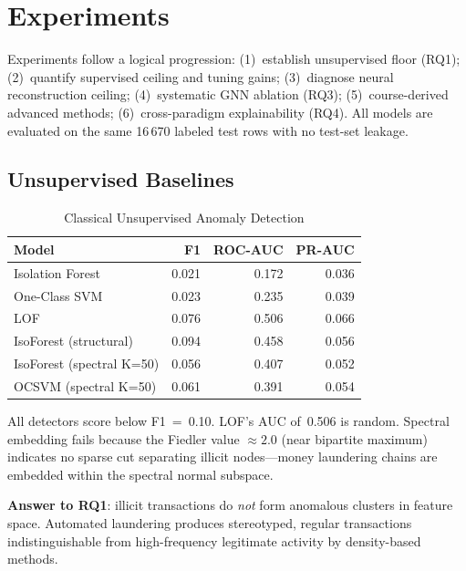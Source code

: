 \documentclass[conference]{IEEEtran}
\begin{document}
\section{Experiments}

Experiments follow a logical progression: (1)~establish unsupervised floor
(RQ1); (2)~quantify supervised ceiling and tuning gains; (3)~diagnose neural
reconstruction ceiling; (4)~systematic GNN ablation (RQ3); (5)~course-derived
advanced methods; (6)~cross-paradigm explainability (RQ4).  All models are
evaluated on the same 16\,670 labeled test rows with no test-set leakage.

\subsection{Unsupervised Baselines}

\begin{table}[htbp]
\centering
\caption{Classical Unsupervised Anomaly Detection}
\label{tab:unsupervised}
\renewcommand{\arraystretch}{1.1}
\begin{tabular}{@{}lrrr@{}}
\toprule
Model & F1 & ROC-AUC & PR-AUC \\
\midrule
Isolation Forest          & 0.021 & 0.172 & 0.036 \\
One-Class SVM             & 0.023 & 0.235 & 0.039 \\
LOF                       & 0.076 & 0.506 & 0.066 \\
IsoForest (structural)    & 0.094 & 0.458 & 0.056 \\
IsoForest (spectral K=50) & 0.056 & 0.407 & 0.052 \\
OCSVM (spectral K=50)     & 0.061 & 0.391 & 0.054 \\
\bottomrule
\end{tabular}
\end{table}

All detectors score below F1~=~0.10.  LOF's AUC of~0.506 is random.
Spectral embedding fails because the Fiedler value $\approx 2.0$ (near
bipartite maximum) indicates no sparse cut separating illicit nodes---money
laundering chains are embedded within the spectral normal subspace.

\textbf{Answer to RQ1}: illicit transactions do \emph{not} form anomalous
clusters in feature space.  Automated laundering produces stereotyped,
regular transactions indistinguishable from high-frequency legitimate activity
by density-based methods.
\end{document}
